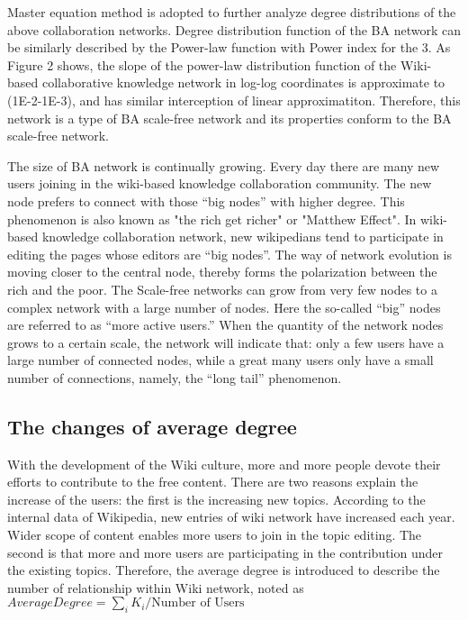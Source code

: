 \documentclass{elsarticle}
\begin{document}
Master equation method is adopted to further analyze degree
distributions of the above collaboration networks\cite{PhysRevLett.85.4633}. Degree
distribution function of the BA network can be similarly described by
the Power-law function with Power index for the 3. As Figure 2 shows,
the slope of the power-law distribution function of the Wiki-based
collaborative knowledge network in log-log coordinates is approximate
to (1E-2-1E-3), and has similar interception of 
linear approximatiton. Therefore, this network is a type
of BA scale-free network and its properties  conform to the
BA scale-free network.

The size of BA network is continually growing. Every day there
are many new users joining in the wiki-based knowledge collaboration
community.  
The new node prefers to connect with those
“big nodes” with higher degree. This phenomenon is also known as "the
rich get richer" or "Matthew Effect". In wiki-based knowledge
collaboration network, new wikipedians tend to participate in editing
the pages whose editors are “big nodes”. The way of network evolution
is moving closer to the central node, thereby forms the polarization
between the rich and the poor. The Scale-free networks can grow from
very few nodes to a complex network with a large number of nodes. Here
the so-called “big” nodes are referred to as “more active users.” When the
quantity of the network nodes grows to a certain scale, the network
will indicate that: only a few users have a large number of connected
nodes, while a great many users only have a small number of
connections, namely, the “long tail” phenomenon. 


\subsection{The changes of average degree}
\label{sec:chang-aver-degr}

With the development of the Wiki culture, more and more people devote
their efforts to contribute to the free content.  There are two
reasons explain the increase of the users: the first
is the increasing new topics. According to the internal data of
Wikipedia, new entries of wiki network have increased each year.
Wider scope of content enables more users to join in the topic editing. The
second is that more and more users are participating in the
contribution under the existing topics. Therefore, the average degree
is introduced to describe the number of relationship within Wiki
network, noted as $AverageDegree = \sum_iK_i/\text{Number of Users}$
\end{document}
